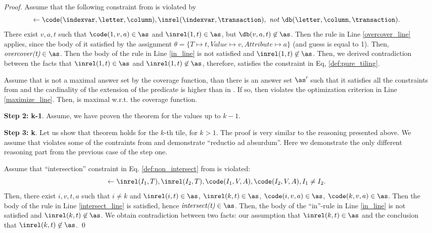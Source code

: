 \begin{proof}
Assume that the following constraint from \constr is violated by \as
\begin{equation*}
\leftarrow  \code(\indexvar,\letter, \column),\inrel(\indexvar,\transaction),~\textit{not } \db(\letter, \column, \transaction). 
\end{equation*}
There exist $v, a, t$ such that $\code(1,v,a) \in \as$ and $\inrel(1,t) \in \as$, but $\db(v,a,t) \not \in \as$. Then the rule in Line \ref{overcover_line} applies, since the body of it satisfied by the assignment $\theta = \{ T \mapsto t, Value \mapsto v, Attribute \mapsto a\}$ (and guess is equal to 1). Then, $\textit{overcover(t)} \in \as$. Then the body of the rule in Line \ref{in_line} is not satisfied and $\inrel(1,t) \not \in \as$. Then, we derived contradiction between the facts that $\inrel(1,t) \in \as$ and $\inrel(1,t) \not \in \as$, therefore, \as satisfies the constraint in Eq, \ref{def:pure_tiling}.

Assume that \as is not a maximal answer set by the coverage function, than there is an answer set $\as'$ such that it satisfies all the constraints from \constr and the cardinality of the extension of the predicate \covered is higher than in \as. If so, then \as violates the optimization criterion in Line \ref{maximize_line}. Then, \as is maximal w.r.t. the coverage function.

\textbf{Step 2: k-1}. Assume, we have proven the theorem for the values up to $k-1$.

\textbf{Step 3: k}. Let us show that theorem holds for the $k$-th tile, for $k > 1$. The proof is very similar to the reasoning presented above. We assume that \as violates some of the contraints from \constr and demonstrate ``reductio ad absurdum''. Here we demonstrate the only different reasoning part from the previous case of the step one.

Assume that ``intersection'' constraint in Eq. \ref{def:non_intersect} from \constr is violated:
\begin{equation*}
\leftarrow  \inrel(I_1,T), \inrel(I_2,T), \code(I_1,V,A), \code(I_2,V,A), I_1 \neq I_2.
\end{equation*}
Then, there exist $i, v, t, a$ such that $i \neq k$ and $\inrel(i,t) \in \as$, $\inrel(k,t) \in \as$, $\code(i,v,a) \in \as$, $\code(k,v,a) \in \as$. Then the body of the rule in Line \ref{intersect_line} is satisfied, hence $\textit{intersect(t)} \in \as$. Then, the body of the ``in''-rule in Line \ref{in_line} is not satisfied and $\inrel(k,t) \not \in \as$. We obtain contradiction between two facts: our assumption that $\inrel(k,t) \in \as$ and the conclusion that $\inrel(k,t) \not \in \as$.
 \qed
\end{proof}
